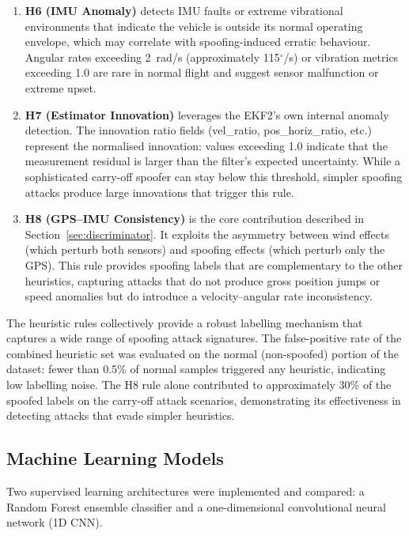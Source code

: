\documentclass[electronics,article,accept,moreauthors]{Definitions/mdpi}
\begin{document}
\begin{enumerate}
    \item \textbf{H6 (IMU Anomaly)} detects IMU faults or extreme vibrational environments that indicate the vehicle is outside its normal operating envelope, which may correlate with spoofing-induced erratic behaviour. Angular rates exceeding 2~rad/s (approximately 115$^\circ$/s) or vibration metrics exceeding 1.0 are rare in normal flight and suggest sensor malfunction or extreme upset.

    \item \textbf{H7 (Estimator Innovation)} leverages the EKF2's own internal anomaly detection. The innovation ratio fields (vel\_ratio, pos\_horiz\_ratio, etc.) represent the normalised innovation: values exceeding 1.0 indicate that the measurement residual is larger than the filter's expected uncertainty. While a sophisticated carry-off spoofer can stay below this threshold, simpler spoofing attacks produce large innovations that trigger this rule.

    \item \textbf{H8 (GPS--IMU Consistency)} is the core contribution described in Section~\ref{sec:discriminator}. It exploits the asymmetry between wind effects (which perturb both sensors) and spoofing effects (which perturb only the GPS). This rule provides spoofing labels that are complementary to the other heuristics, capturing attacks that do not produce gross position jumps or speed anomalies but do introduce a velocity--angular rate inconsistency.
\end{enumerate}

The heuristic rules collectively provide a robust labelling mechanism that captures a wide range of spoofing attack signatures. The false-positive rate of the combined heuristic set was evaluated on the normal (non-spoofed) portion of the dataset: fewer than 0.5\% of normal samples triggered any heuristic, indicating low labelling noise. The H8 rule alone contributed to approximately 30\% of the spoofed labels on the carry-off attack scenarios, demonstrating its effectiveness in detecting attacks that evade simpler heuristics.



\subsection{Machine Learning Models}
\label{sec:mlmodels}

Two supervised learning architectures were implemented and compared: a Random Forest ensemble classifier and a one-dimensional convolutional neural network (1D CNN).
\end{document}
